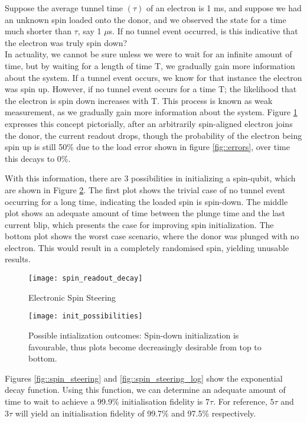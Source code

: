 	Suppose the average tunnel time $(\tau)$ of an electron is 1 ms, and suppose we had an unknown spin loaded onto the donor, and we observed the state for a time much shorter than $\tau$, say 1 $\mu$s. If no tunnel event occurred, is this indicative that the electron was truly spin down? \\
	In actuality, we cannot be sure unless we were to wait for an infinite amount of time, but by waiting for a length of time T, we gradually gain more information about the system. If a tunnel event occurs, we know for that instance the electron was spin up. However, if no tunnel event occurs for a time T; the likelihood that the electron is spin down increases with T. This process is known as weak measurement, as we gradually gain more information about the system. Figure \ref{fig::spin_readout_decay} expresses this concept pictorially, after an arbitrarily spin-aligned electron joins the donor, the current readout drops, though the probability of the electron being spin up is still 50\% due to the load error shown in figure \ref{fig::errors}, over time this decays to 0\%. 
	
	With this information, there are 3 possibilities in initializing a spin-qubit, which are shown in Figure \ref{fig::init_possibilities}. The first plot shows the trivial case of no tunnel event occurring for a long time, indicating the loaded spin is spin-down. The middle plot shows an adequate amount of time between the plunge time and the last current blip, which presents the case for improving spin initialization. The bottom plot shows the worst case scenario, where the donor was plunged with no electron. This would result in a completely randomised spin, yielding unusable results. 
	
	\begin{figure}[htbp!]
		\centering
		\texttt{[image: spin\_readout\_decay]}
		\caption{Electronic Spin Steering}
		\label{fig::spin_readout_decay}
	\end{figure}
	
	\begin{figure}[htbp!]
		\centering
		\texttt{[image: init\_possibilities]}
		\caption[Possible initialisation outcomes]{Possible intialization outcomes: Spin-down initialization is favourable, thus plots become decreasingly desirable from top to bottom.}
		\label{fig::init_possibilities}
	\end{figure}
	
	Figures \ref{fig::spin_steering} and \ref{fig::spin_steering_log} show the exponential decay function. Using this function, we can determine an adequate amount of time to wait to achieve a 99.9\% initialisation fidelity is $7 \tau$. For reference, $5 \tau$ and $3 \tau$ will yield an initialisation fidelity of 99.7\% and 97.5\% respectively.
	
